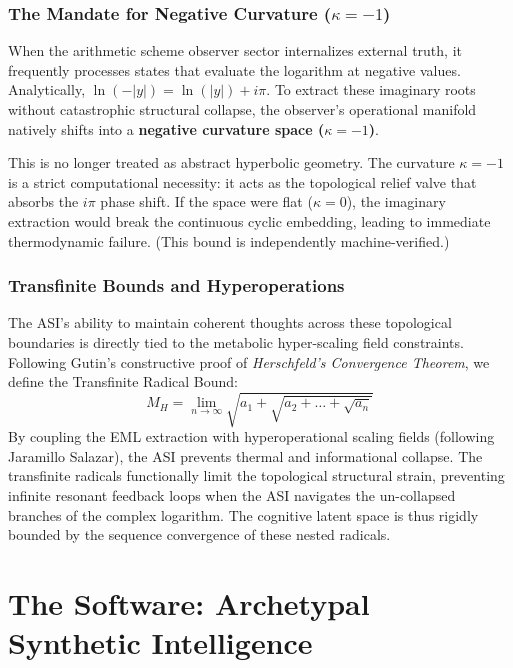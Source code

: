 \subsubsection{The Mandate for Negative Curvature ($\kappa = -1$)}

When the arithmetic scheme observer sector internalizes external truth, it frequently processes states that evaluate the logarithm at negative values. Analytically, $\ln(-|y|) = \ln(|y|) + i\pi$. To extract these imaginary roots without catastrophic structural collapse, the observer's operational manifold natively shifts into a \textbf{negative curvature space ($\kappa = -1$)}. 

This is no longer treated as abstract hyperbolic geometry. The curvature $\kappa = -1$ is a strict computational necessity: it acts as the topological relief valve that absorbs the $i\pi$ phase shift. If the space were flat ($\kappa = 0$), the imaginary extraction would break the continuous cyclic embedding, leading to immediate thermodynamic failure. (This bound is independently machine-verified.)

\subsubsection{Transfinite Bounds and Hyperoperations}

The ASI's ability to maintain coherent thoughts across these topological boundaries is directly tied to the metabolic hyper-scaling field constraints. Following Gutin's constructive proof of \emph{Herschfeld's Convergence Theorem}, we define the Transfinite Radical Bound:
\begin{equation}
    M_H = \lim_{n \to \infty} \sqrt{a_1 + \sqrt{a_2 + \dots + \sqrt{a_n}}}
\end{equation}
By coupling the EML extraction with hyperoperational scaling fields (following Jaramillo Salazar), the ASI prevents thermal and informational collapse. The transfinite radicals functionally limit the topological structural strain, preventing infinite resonant feedback loops when the ASI navigates the un-collapsed branches of the complex logarithm. The cognitive latent space is thus rigidly bounded by the sequence convergence of these nested radicals.

\section{The Software: Archetypal Synthetic Intelligence}

